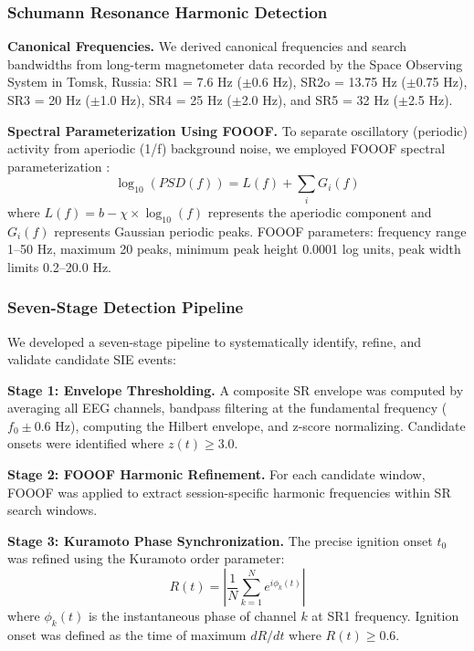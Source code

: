 \documentclass[11pt,a4paper]{article}
\begin{document}
\subsubsection{Schumann Resonance Harmonic Detection}

\textbf{Canonical Frequencies.}
We derived canonical frequencies and search bandwidths from long-term magnetometer data recorded by the Space Observing System in Tomsk, Russia: SR1 = 7.6 Hz ($\pm$0.6 Hz), SR2o = 13.75 Hz ($\pm$0.75 Hz), SR3 = 20 Hz ($\pm$1.0 Hz), SR4 = 25 Hz ($\pm$2.0 Hz), and SR5 = 32 Hz ($\pm$2.5 Hz).

\textbf{Spectral Parameterization Using FOOOF.}
To separate oscillatory (periodic) activity from aperiodic (1/f) background noise, we employed FOOOF spectral parameterization \parencite{donoghue2020fooof}:
\begin{equation}
\log_{10}(PSD(f)) = L(f) + \sum_{i} G_{i}(f)
\end{equation}
where $L(f) = b - \chi \times \log_{10}(f)$ represents the aperiodic component and $G_i(f)$ represents Gaussian periodic peaks. FOOOF parameters: frequency range 1--50 Hz, maximum 20 peaks, minimum peak height 0.0001 log units, peak width limits 0.2--20.0 Hz.

\subsubsection{Seven-Stage Detection Pipeline}

We developed a seven-stage pipeline to systematically identify, refine, and validate candidate SIE events:

\textbf{Stage 1: Envelope Thresholding.}
A composite SR envelope was computed by averaging all EEG channels, bandpass filtering at the fundamental frequency ($f_0 \pm 0.6$ Hz), computing the Hilbert envelope, and z-score normalizing. Candidate onsets were identified where $z(t) \geq 3.0$.

\textbf{Stage 2: FOOOF Harmonic Refinement.}
For each candidate window, FOOOF was applied to extract session-specific harmonic frequencies within SR search windows.

\textbf{Stage 3: Kuramoto Phase Synchronization.}
The precise ignition onset $t_0$ was refined using the Kuramoto order parameter:
\begin{equation}
R(t) = \left| \frac{1}{N} \sum_{k=1}^{N} e^{i\phi_k(t)} \right|
\end{equation}
where $\phi_k(t)$ is the instantaneous phase of channel $k$ at SR1 frequency. Ignition onset was defined as the time of maximum $dR/dt$ where $R(t) \geq 0.6$.
\end{document}
